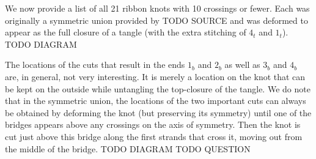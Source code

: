 \begin{paper}
We now provide a list of all 21 ribbon knots with 10 crossings or fewer.
Each was originally a symmetric union provided by TODO SOURCE and was deformed
to appear as the full closure of a tangle (with the extra stitching of $4_t$ and
$1_t$).
TODO DIAGRAM

The locations of the cuts that result in the ends $1_b$ and $2_b$ as well as
$3_b$ and $4_b$ are, in general, not very interesting.
It is merely a location on the knot that can be kept on the outside while
untangling the top-closure of the tangle.
We do note that in the symmetric union, the locations of the two important cuts
can always be obtained by deforming the knot (but preserving its symmetry) until
one of the bridges appears above any crossings on the axis of symmetry.
Then the knot is cut just above this bridge along the first strands that cross
it, moving out from the middle of the bridge.
TODO DIAGRAM
TODO QUESTION
\end{paper}

